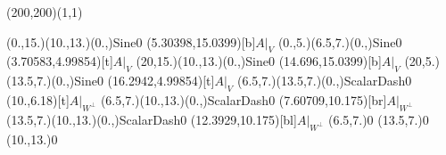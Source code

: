 \unitlength=1bp%

\begin{feynartspicture}(200,200)(1,1)

\FADiagram{}
\FAProp(0.,15.)(10.,13.)(0.,){Sine}{0}
\FALabel(5.30398,15.0399)[b]{$A|_V$}
\FAProp(0.,5.)(6.5,7.)(0.,){Sine}{0}
\FALabel(3.70583,4.99854)[t]{$A|_V$}
\FAProp(20,15.)(10.,13.)(0.,){Sine}{0}
\FALabel(14.696,15.0399)[b]{$A|_V$}
\FAProp(20,5.)(13.5,7.)(0.,){Sine}{0}
\FALabel(16.2942,4.99854)[t]{$A|_V$}
\FAProp(6.5,7.)(13.5,7.)(0.,){ScalarDash}{0}
\FALabel(10.,6.18)[t]{$A|_{W^\perp}$}
\FAProp(6.5,7.)(10.,13.)(0.,){ScalarDash}{0}
\FALabel(7.60709,10.175)[br]{$A|_{W^\perp}$}
\FAProp(13.5,7.)(10.,13.)(0.,){ScalarDash}{0}
\FALabel(12.3929,10.175)[bl]{$A|_{W^\perp}$}
\FAVert(6.5,7.){0}
\FAVert(13.5,7.){0}
\FAVert(10.,13.){0}
\end{feynartspicture}

